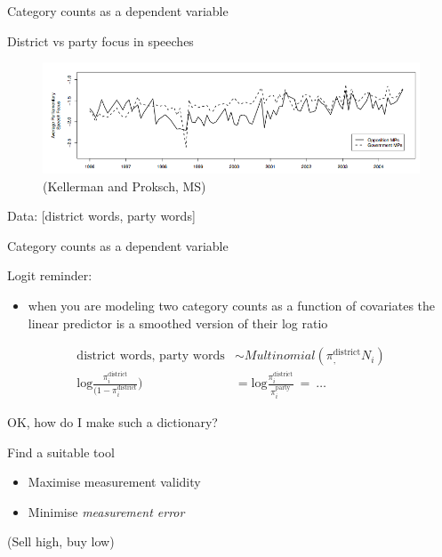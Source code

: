 \documentclass{hertieteaching}
\begin{document}
\begin{frame}{Category counts as a dependent variable}
\protect\hypertarget{category-counts-as-a-dependent-variable}{}

District vs party focus in speeches

\begin{figure}

{\centering \includegraphics[width=0.9\linewidth]{pictures/district-party-focus} 

}

\caption{(Kellerman and Proksch, MS)}\label{fig:unnamed-chunk-13}
\end{figure}

Data: {[}district words, party words{]}

\end{frame}

\begin{frame}{Category counts as a dependent variable}
\protect\hypertarget{category-counts-as-a-dependent-variable-1}{}

Logit reminder:

\begin{itemize}
\item
  when you are modeling two category counts as a function of covariates
  the linear predictor is a smoothed version of their log ratio
\end{itemize}

\[
\begin{aligned}
\text{district words, party words} & \sim Multinomial(\pi^\text{district}_, N_i)\\ 
\text{log}\frac{\pi^\text{district}_i}{(1 - \pi^\text{district}_i}) & = \text{log}\frac{\pi^\text{district}_i}{\pi^\text{party}_i} ~=~ \ldots 
\end{aligned}
\]

\end{frame}

\begin{frame}{OK, how do I make such a dictionary?}
\protect\hypertarget{ok-how-do-i-make-such-a-dictionary}{}

Find a suitable tool

\begin{itemize}
\item
  Maximise measurement validity\item
  Minimise \emph{measurement error}
\end{itemize}

\pause

(Sell high, buy low)

\end{frame}
\end{document}

